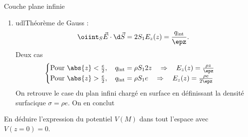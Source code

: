 \begin{exo}[PC][2][TD]{Couche plane infinie}
\begin{quest}
{\begin{enumerate}
      \item udl{Théorème de Gauss} :
      $$
  \oiint_S \Vec{E} \cdot \d \Vec{S} = 2S_1E_z(z) = \frac{q_{\rm int}}{\epz}.
  $$
  Deux cas 
  $$
  \begin{cases}
  \text{Pour } \abs{z}<\frac{e}{2}, \quad q_{\rm int} = \rho S_1 2z \quad \Rightarrow \quad E_z(z) = \frac{\rho z}{\epz} \\
  \text{Pour } \abs{z}>\frac{e}{2}, \quad q_{\rm int} = \rho S_1 e \quad \Rightarrow \quad E_z(z) = \frac{\rho e}{2\epz} \\
  \end{cases}
  $$
  On retrouve le case du plan infini chargé en surface en définissant la densité surfacique $\sigma = \rho e$. On en conclut
  \end{enumerate}
    }
    \item En déduire l'expression du potentiel $V(M)$ dans tout l'espace avec $V(z=0)=0$.
\end{quest}
\end{exo}

